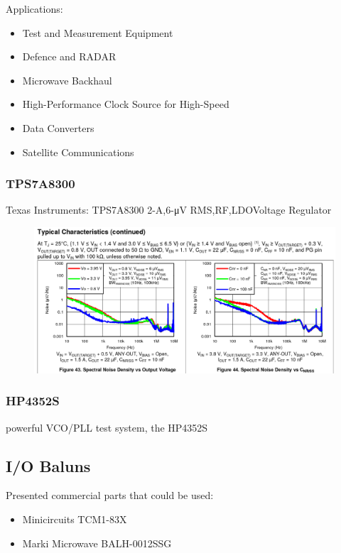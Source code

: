 \documentclass{article}
\begin{document}
Applications: 

\begin{itemize}
	\item Test and Measurement Equipment
	\item Defence and RADAR
	\item Microwave Backhaul
	\item High-Performance Clock Source for High-Speed
	\item Data Converters
	\item Satellite Communications
\end{itemize}


\subsubsection*{TPS7A8300}

Texas Instruments: TPS7A8300 2-\unit{\ampere},6-\unit{\micro\volt} RMS,RF,LDOVoltage Regulator

\begin{figure}[ht!]
	\includegraphics[width=0.5\linewidth]{Figures/LDO-noise-characteristic.png}
	\label{fig:ldo-noise-documntation}
\end{figure}


\subsubsection*{HP4352S}

powerful VCO/PLL test system, the HP4352S

\subsection{I/O Baluns}

Presented commercial parts that could be used:

\begin{itemize}
	\item Minicircuits TCM1-83X
	\item Marki Microwave BALH-0012SSG
\end{itemize}
\end{document}
